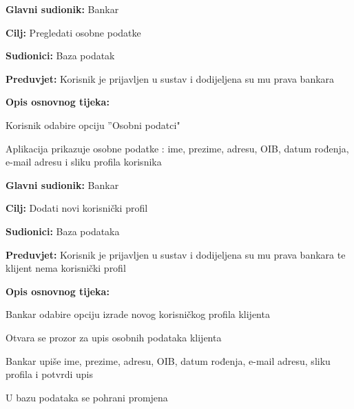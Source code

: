 		
			\noindent {}
			\begin{packed_item}
				
				\item \textbf{Glavni sudionik: }Bankar
				\item  \textbf{Cilj:} Pregledati osobne podatke
				\item  \textbf{Sudionici:} Baza podatak
				\item  \textbf{Preduvjet:} Korisnik je prijavljen u sustav i dodijeljena su mu prava bankara 
				\item  \textbf{Opis osnovnog tijeka:}
				
				\item[] \begin{packed_enum}
					\item  Korisnik odabire opciju ”Osobni podatci"
					\item  Aplikacija prikazuje osobne podatke : ime, prezime, adresu, OIB, datum rođenja, e-mail adresu i sliku profila korisnika
				\end{packed_enum}
				
			\end{packed_item}
            		
          
          
            \noindent {}
            \begin{packed_item}
                
                  \item \textbf{Glavni sudionik: }Bankar
                  \item  \textbf{Cilj:} Dodati novi korisnički profil
                  \item  \textbf{Sudionici:} Baza podataka
                  \item  \textbf{Preduvjet:} Korisnik je prijavljen u sustav i dodijeljena su mu prava bankara te klijent nema korisnički profil
                  \item  \textbf{Opis osnovnog tijeka:}
                  
                  \item[] \begin{packed_enum}
                
                    \item  Bankar odabire opciju izrade novog korisničkog profila klijenta
                    \item  Otvara se prozor za upis osobnih podataka klijenta
                    \item  Bankar upiše ime, prezime, adresu, OIB, datum rođenja, e-mail adresu, sliku profila i potvrdi upis
                    \item  U bazu podataka se pohrani promjena                              
                  \end{packed_enum}
                  
                \end{packed_item}
            
